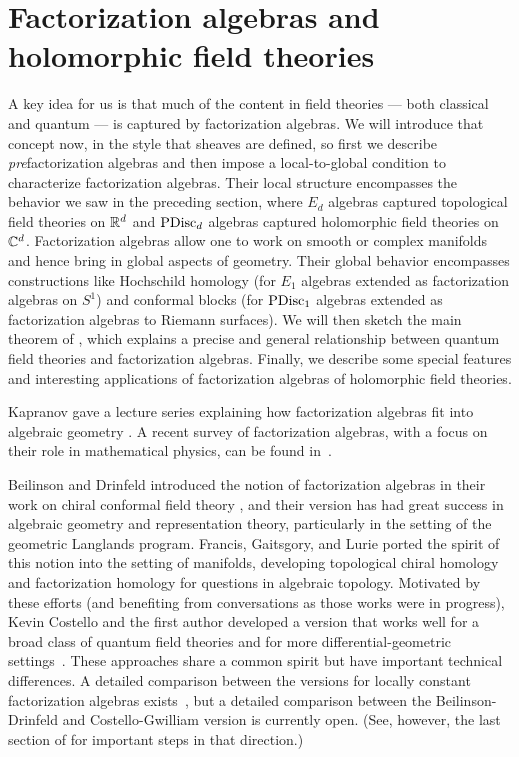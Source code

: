 \documentclass[11pt]{amsart}
\begin{document}
\section{Factorization algebras and holomorphic field theories}
\label{sec: fact alg}

A key idea for us is that much of the content in field theories --- both classical and quantum --- is captured by factorization algebras.
We will introduce that concept now, in the style that sheaves are defined, so first we describe {\em pre}\/factorization algebras and then impose a local-to-global condition to characterize factorization algebras.
Their local structure encompasses the behavior we saw in the preceding section, where $E_d$ algebras captured topological field theories on $\mathbb R^d$ and ${\rm PDisc}_d$ algebras captured holomorphic field theories on~$\mathbb C^d$.
Factorization algebras allow one to work on smooth or complex manifolds and hence bring in global aspects of geometry.
Their global behavior encompasses constructions like Hochschild homology (for $E_1$ algebras extended as factorization algebras on $S^1$) and conformal blocks (for ${\rm PDisc}_1$ algebras extended as factorization algebras to Riemann surfaces).
We will then sketch the main theorem of \cite{CG2}, 
which explains a precise and general relationship between quantum field theories and factorization algebras.
Finally, we describe some special features and interesting applications of factorization algebras of holomorphic field theories.

Kapranov gave a lecture series explaining how factorization algebras fit into algebraic geometry \cite{KapLect}.
A recent survey of factorization algebras, with a focus on their role in mathematical physics, can be found in~\cite{CosGwEMP}.

\begin{rmk}
Beilinson and Drinfeld introduced the notion of factorization algebras in their work on chiral conformal field theory \cite{BD},
and their version has had great success in algebraic geometry and representation theory,
particularly in the setting of the geometric Langlands program.
Francis, Gaitsgory, and Lurie ported the spirit of this notion into the setting of manifolds,
developing topological chiral homology \cite{LurieHA} and factorization homology \cite{AF}
for questions in algebraic topology.
Motivated by these efforts (and benefiting from conversations as those works were in progress), 
Kevin Costello and the first author developed a version that works well for a broad class of quantum field theories and for more differential-geometric settings~\cite{CG1,CG2}.
These approaches share a common spirit but have important technical differences.
A detailed comparison between the versions for locally constant factorization algebras exists~\cite{KSW},
but a detailed comparison between the Beilinson-Drinfeld and Costello-Gwilliam version is currently open.
(See, however, the last section of \cite{HenKap} for important steps in that direction.)
\end{rmk}
\end{document}
